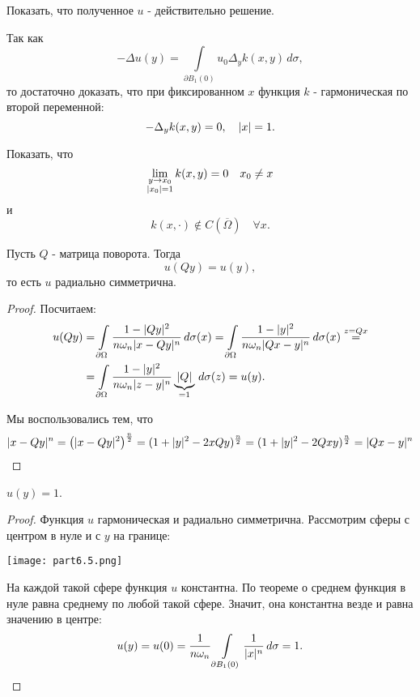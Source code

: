 \begin{exercise} Показать, что полученное $u$ - действительно решение.
\end{exercise}
\begin{note}Так как
$$- \Delta u(y) = \int \limits_{\partial B_1 (0)} u_0 \Delta_y k(x, y) \, d\sigma,$$
то достаточно доказать, что при фиксированном $x$ функция $k$ - гармоническая по второй переменной:
$$ - \Delta_y k(x,y) = 0, \quad \lvert x\rvert = 1.$$
\end{note}

\begin{exercise} Показать, что
$$ \lim_{\substack{y \to x_0 \\ \lvert x_0\rvert = 1}} k(x, y) = 0 \quad x_0 \neq x$$
и
$$ k( x, \cdot) \notin C(\overline{\Omega}) \quad \forall x.$$
\end{exercise}

\begin{note}Пусть $Q$ - матрица поворота. Тогда
$$ u(Qy) = u(y),$$
то есть $u$ радиально симметрична.
\end{note}
\begin{proof}
Посчитаем:
\begin{align*}
	u(Qy) &= \int \limits_{\partial \Omega} \frac {1 - \lvert Qy\rvert^2} {n \omega_n \lvert x-Qy\rvert^n} \, d\sigma(x) = \int \limits_{\partial \Omega} \frac {1 - \lvert y\rvert^2} {n \omega_n \lvert Qx-y\rvert^n} \, d\sigma(x) \stackrel{z = Qx} = \\
	&= \int \limits_{\partial \Omega} \frac {1 - \lvert y\rvert^2} {n \omega_n \lvert z - y\rvert^n} \underbrace {\lvert Q\rvert}_{=1} \, d\sigma(z) = u(y). 
\end{align*}

Мы воспользовались тем, что
\begin{align*}
	\lvert x-Qy\rvert^n = \left( \lvert x-Qy\rvert^2 \right)^{\frac {n} {2}} = (1 + \lvert y\rvert^2 - 2 x Q y)^{\frac {n} {2}} = (1 + \lvert y\rvert^2 - 2Qxy)^{\frac {n} {2}} = \lvert Qx - y\rvert^n
\end{align*}

\end{proof}

\begin{note} $u(y) = 1$.
\end{note}
\begin{proof}
Функция $u$ гармоническая и радиально симметрична. Рассмотрим сферы с центром в нуле и с $y$ на границе:
\begin{center}
\texttt{[image: part6.5.png]}
\end{center}
На каждой такой сфере функция $u$ константна. По теореме о среднем функция в нуле равна среднему по любой такой сфере. Значит, она константна везде и равна значению в центре:
$$ u(y) = u(0) = \frac {1} {n \omega_n} \int \limits_{\partial B_1 (0)} \frac {1} {\lvert x\rvert^n} \, d\sigma = 1.$$

\end{proof}

